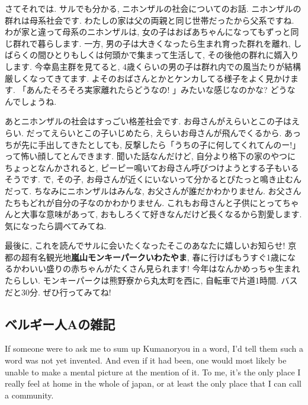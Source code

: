 \documentclass[10pt,b5jsbook,dvips,dvipdfmx,openany]{jsbook}
\theoremstyle{definition}
\begin{document}
		さてそれでは. サルでも分かる, ニホンザルの社会についてのお話. ニホンザルの群れは母系社会です. わたしの家は父の両親と同じ世帯だったから父系ですね. わが家と違って母系のニホンザルは, 女の子はおばあちゃんになってもずっと同じ群れで暮らします. 一方, 男の子は大きくなったら生まれ育った群れを離れ, しばらくの間ひとりもしくは何頭かで集まって生活して, その後他の群れに婿入りします. 今幸島主群を見てると, 4歳くらいの男の子は群れ内での風当たりが結構厳しくなってきてます. よそのおばさんとかとケンカしてる様子をよく見かけます. 「あんたそろそろ実家離れたらどうなの! 」みたいな感じなのかな? どうなんでしょうね. 
		
		あとニホンザルの社会はすっごい格差社会です. お母さんがえらいとこの子はえらい. だってえらいとこの子いじめたら, えらいお母さんが飛んでくるから. あっちが先に手出してきたとしても, 反撃したら「うちの子に何してくれてんのー!」って怖い顔してとんできます. 聞いた話なんだけど, 自分より格下の家のやつにちょっとなんかされると, ピーピー鳴いてお母さん呼びつけようとする子もいるそうです. で, その子, お母さんが近くにいないって分かるとぴたっと鳴き止むんだって. ちなみにニホンザルはみんな, お父さんが誰だかわかりません. お父さんたちもどれが自分の子なのかわかりません. これもお母さんと子供にとってちゃんと大事な意味があって, おもしろくて好きなんだけど長くなるから割愛します. 気になったら調べてみてね. 
		
		最後に, これを読んでサルに会いたくなったそこのあなたに嬉しいお知らせ! 京都の超有名観光地\textbf{嵐山モンキーパークいわたやま}, 春に行けばもうすぐ1歳になるかわいい盛りの赤ちゃんがたくさん見られます! 今年はなんかめっちゃ生まれたらしい. モンキーパークは熊野寮から丸太町を西に, 自転車で片道1時間. バスだと30分. ぜひ行ってみてね! 


		\subsection{ベルギー人Aの雑記} %
		If someone were to ask me to sum up Kumanoryou in a word, I'd tell them such a word was not yet invented. And even if it had been, one would most likely be unable to make a mental picture at the mention of it. To me, it's the only place I really feel at home in the whole of japan, or at least the only place that I can call a community. 
\end{document}
